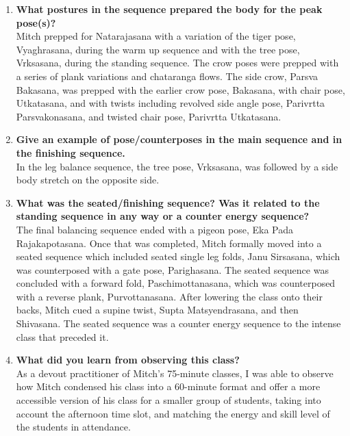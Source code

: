 \documentclass[10pt]{article}
\begin{document}
\begin{enumerate}
    \item \textbf{What postures in the sequence prepared the body for the peak pose(s)?}\\
    Mitch prepped for Natarajasana with a variation of the tiger pose, Vyaghrasana, during the warm up sequence and with the tree pose, Vrksasana, during the standing sequence. The crow poses were prepped with a series of plank variations and chataranga flows. The side crow, Parsva Bakasana, was prepped with the earlier crow pose, Bakasana, with chair pose, Utkatasana, and with twists including revolved side angle pose, Parivrtta Parsvakonasana, and twisted chair pose, Parivrtta Utkatasana.

    \item \textbf{Give an example of pose/counterposes in the main sequence and in the finishing sequence.}\\
    In the leg balance sequence, the tree pose, Vrksasana, was followed by a side body stretch on the opposite side.

    \item \textbf{What was the seated/finishing sequence?  Was it related to the standing sequence in any way or a counter energy sequence?}\\
    The final balancing sequence ended with a pigeon pose, Eka Pada Rajakapotasana. Once that was completed, Mitch formally moved into a seated sequence which included seated single leg folds, Janu Sirsasana, which was counterposed with a gate pose, Parighasana. The seated sequence was concluded with a forward fold, Paschimottanasana, which was counterposed with a reverse plank, Purvottanasana. After lowering the class onto their backs, Mitch cued a supine twist, Supta Matsyendrasana, and then Shivasana. The seated sequence was a counter energy sequence to the intense class that preceded it.

    \item \textbf{What did you learn from observing this class?}\\
    As a devout practitioner of Mitch's 75-minute classes, I was able to observe how Mitch condensed his class into a 60-minute format and offer a more accessible version of his class for a smaller group of students, taking into account the afternoon time slot, and matching the energy and skill level of the students in attendance.

\end{enumerate}
\end{document}
